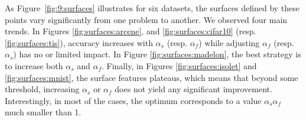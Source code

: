 As Figure~\ref{fig:9:surfaces} illustrates for six datasets, the
surfaces defined by these points vary significantly from one problem to
another. We observed four main trends. In Figures \ref{fig:surfaces:arcene},
and \ref{fig:surfaces:cifar10} (resp. \ref{fig:surfaces:tis}), accuracy
increases with $\alpha_s$ (resp. $\alpha_f$) while adjusting $\alpha_f$ (resp. $\alpha_s$) has no
or limited impact. In Figure \ref{fig:surfaces:madelon}, the best strategy is
to increase both $\alpha_s$ and $\alpha_f$. Finally, in Figures \ref{fig:surfaces:isolet}
and \ref{fig:surfaces:mnist}, the surface features plateaus, which means that
beyond some threshold, increasing $\alpha_s$ or $\alpha_f$ does not yield any significant
improvement. Interestingly, in most of the cases, the optimum corresponds to a
value $\alpha_s\alpha_f$ much smaller than 1.

